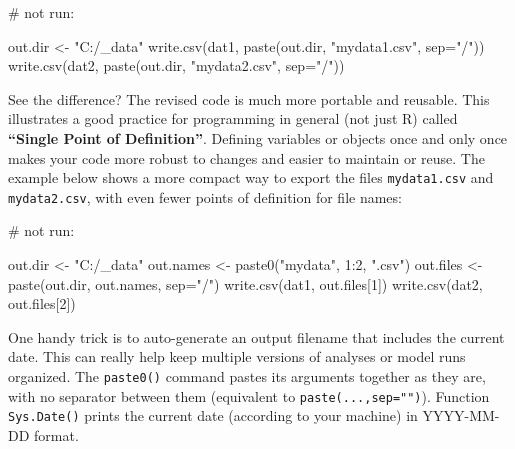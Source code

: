 \documentclass[
  13,
  letterpaper,
]{report}
\newenvironment{Shaded}{\begin{snugshade}}{\end{snugshade}}
\newcommand{\AttributeTok}[1]{\textcolor[rgb]{0.40,0.45,0.13}{#1}}
\newcommand{\CommentTok}[1]{\textcolor[rgb]{0.37,0.37,0.37}{#1}}
\newcommand{\DecValTok}[1]{\textcolor[rgb]{0.68,0.00,0.00}{#1}}
\newcommand{\FunctionTok}[1]{\textcolor[rgb]{0.28,0.35,0.67}{#1}}
\newcommand{\NormalTok}[1]{\textcolor[rgb]{0.00,0.23,0.31}{#1}}
\newcommand{\OtherTok}[1]{\textcolor[rgb]{0.00,0.23,0.31}{#1}}
\newcommand{\SpecialCharTok}[1]{\textcolor[rgb]{0.37,0.37,0.37}{#1}}
\newcommand{\StringTok}[1]{\textcolor[rgb]{0.13,0.47,0.30}{#1}}
\begin{document}
\begin{Shaded}
\begin{Highlighting}[]
\CommentTok{\# not run:}

\NormalTok{out.dir }\OtherTok{\textless{}{-}} \StringTok{"C:/\_data"}
\FunctionTok{write.csv}\NormalTok{(dat1, }\FunctionTok{paste}\NormalTok{(out.dir, }\StringTok{"mydata1.csv"}\NormalTok{, }\AttributeTok{sep=}\StringTok{"/"}\NormalTok{))}
\FunctionTok{write.csv}\NormalTok{(dat2, }\FunctionTok{paste}\NormalTok{(out.dir, }\StringTok{"mydata2.csv"}\NormalTok{, }\AttributeTok{sep=}\StringTok{"/"}\NormalTok{))}
\end{Highlighting}
\end{Shaded}

See the difference? The revised code is much more portable and reusable.
This illustrates a good practice for programming in general (not just R)
called \textbf{``Single Point of Definition''}. Defining variables or
objects once and only once makes your code more robust to changes and
easier to maintain or reuse. The example below shows a more compact way
to export the files \texttt{mydata1.csv} and \texttt{mydata2.csv}, with
even fewer points of definition for file names:

\begin{Shaded}
\begin{Highlighting}[]
\CommentTok{\# not run:}

\NormalTok{out.dir }\OtherTok{\textless{}{-}} \StringTok{"C:/\_data"}
\NormalTok{out.names }\OtherTok{\textless{}{-}} \FunctionTok{paste0}\NormalTok{(}\StringTok{"mydata"}\NormalTok{, }\DecValTok{1}\SpecialCharTok{:}\DecValTok{2}\NormalTok{, }\StringTok{".csv"}\NormalTok{)}
\NormalTok{out.files }\OtherTok{\textless{}{-}} \FunctionTok{paste}\NormalTok{(out.dir, out.names, }\AttributeTok{sep=}\StringTok{"/"}\NormalTok{)}
\FunctionTok{write.csv}\NormalTok{(dat1, out.files[}\DecValTok{1}\NormalTok{])}
\FunctionTok{write.csv}\NormalTok{(dat2, out.files[}\DecValTok{2}\NormalTok{])}
\end{Highlighting}
\end{Shaded}

One handy trick is to auto-generate an output filename that includes the
current date. This can really help keep multiple versions of analyses or
model runs organized. The \texttt{paste0()} command pastes its arguments
together as they are, with no separator between them (equivalent to
\texttt{paste(...,sep="")}). Function \texttt{Sys.Date()} prints the
current date (according to your machine) in YYYY-MM-DD format.
\end{document}
